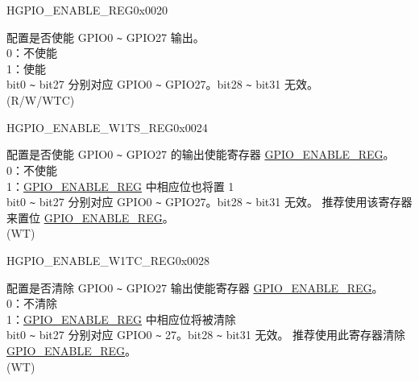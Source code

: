 \begin{register}{H}{GPIO\_ENABLE\_REG}{0x0020}\label{regdesc:GPIOENABLEREG}
%
\regnewline%
\begin{regdesc}\begin{reglist}
\label{fielddesc:GPIOENABLEDATA}\item [GPIO\_ENABLE\_DATA] 配置是否使能 GPIO0 \verb+~+ GPIO27 输出。\\
0：不使能\\
1：使能\\
bit0 \verb+~+ bit27 分别对应 GPIO0 \verb+~+ GPIO27。bit28 \verb+~+ bit31 无效。\\
(R/W/WTC)
\end{reglist}\end{regdesc}
\end{register}


\begin{register}{H}{GPIO\_ENABLE\_W1TS\_REG}{0x0024}\label{regdesc:GPIOENABLEW1TSREG}
%
\regnewline%
\begin{regdesc}\begin{reglist}
\label{fielddesc:GPIOENABLEW1TS}\item [GPIO\_ENABLE\_W1TS] 配置是否使能 GPIO0 \verb+~+ GPIO27 的输出使能寄存器 \hyperref[regdesc:GPIOENABLEREG]{GPIO\_ENABLE\_REG}。\\
0：不使能\\
1：\hyperref[regdesc:GPIOENABLEREG]{GPIO\_ENABLE\_REG} 中相应位也将置 1\\
bit0 \verb+~+ bit27 分别对应 GPIO0 \verb+~+ GPIO27。bit28 \verb+~+ bit31 无效。
推荐使用该寄存器来置位 \hyperref[regdesc:GPIOENABLEREG]{GPIO\_ENABLE\_REG}。\\
(WT)
\end{reglist}\end{regdesc}
\end{register}


\begin{register}{H}{GPIO\_ENABLE\_W1TC\_REG}{0x0028}\label{regdesc:GPIOENABLEW1TCREG}
%
\regnewline%
\begin{regdesc}\begin{reglist}
\label{fielddesc:GPIOENABLEW1TC}\item [GPIO\_ENABLE\_W1TC] 配置是否清除 GPIO0 \verb+~+ GPIO27 输出使能寄存器 \hyperref[regdesc:GPIOENABLEREG]{GPIO\_ENABLE\_REG}。 \\
0：不清除\\
1：\hyperref[regdesc:GPIOENABLEREG]{GPIO\_ENABLE\_REG} 中相应位将被清除\\
bit0 \verb+~+ bit27 分别对应 GPIO0 \verb+~+ 27。bit28 \verb+~+ bit31 无效。
推荐使用此寄存器清除 \hyperref[regdesc:GPIOENABLEREG]{GPIO\_ENABLE\_REG}。\\
(WT)
\end{reglist}\end{regdesc}
\end{register}

